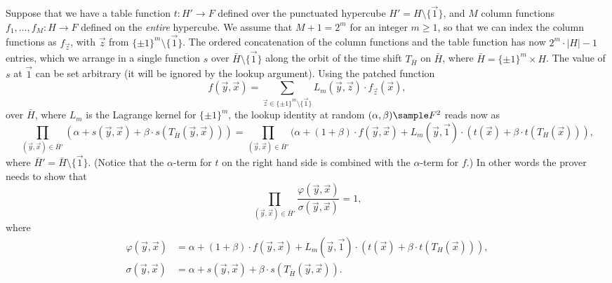 \documentclass[11pt]{article}
\theoremstyle{definition}
\theoremstyle{remark}
\begin{document}
Suppose that we have a table function $t:H'\rightarrow F$ defined over the punctuated hypercube $H' = H\setminus\{\vec 1\}$, and $M$ column functions $f_1,\ldots, f_M: H\rightarrow F$ defined on the \textit{entire} hypercube.
We assume that  $M + 1=2^m $ for an integer $m\geq 1$, so that we can index the column functions as $f_{\vec z}$, with $\vec z$ from $\{\pm 1\}^m \setminus \{\vec 1\}$.
The ordered concatenation of the column functions and the table function has now $2^m \cdot |H| - 1$ entries, which we arrange in a single function $s$ over $\bar H\setminus \{\vec 1\}$ along the orbit of the time shift $T_{\bar H}$ on $\bar H$, where  $\bar H = \{\pm 1\}^m\times H$.
The value of $s$ at $\vec 1$ can be set arbitrary (it will be ignored by the lookup argument).
Using the patched  function
\[
f(\vec y, \vec x) = \sum_{\vec z \in \{\pm 1\}^m\setminus\{\vec 1\}} L_m(\vec y, \vec z)\cdot f_{\vec z}(\vec x),
\]
over $\bar H$, where $L_m$ is the Lagrange kernel for $\{\pm 1\}^m$, the lookup identity at random $(\alpha,\beta)\sample F^2$ reads now as
\[
\prod_{(\vec y, \vec x)\in \bar H'}  (\alpha + s(\vec y, \vec x) + \beta\cdot s(T_{\bar H} (\vec y, \vec x))) = \prod_{(\vec y, \vec x)\in \bar H'}  (\alpha + (1 + \beta)\cdot f(\vec y, \vec x) + L_{m}(\vec y, \vec 1)\cdot (t(\vec x) + \beta \cdot t(T_H(\vec x))),
\]
where $\bar H' = \bar H\setminus\{\vec 1\}$.
(Notice that the $\alpha$-term for $t$ on the right hand side is combined with the $\alpha$-term for $f$.)
In other words the prover needs to show that
\[
\prod_{(\vec y, \vec x)\in \bar H'}\frac{\varphi(\vec y, \vec x)}{\sigma(\vec y,\vec x)} = 1,
\]
where 
\begin{align*}
\varphi(\vec y, \vec x) &= \alpha + (1+\beta)\cdot f(\vec y, \vec x) + L_m(\vec y, \vec 1)\cdot (t(\vec x) + \beta \cdot t(T_H(\vec x))), 
\\
\sigma(\vec y, \vec x) &= \alpha + s(\vec y, \vec x) + \beta\cdot s(T_{\bar H} (\vec y, \vec x)).
\end{align*} 
\end{document}
